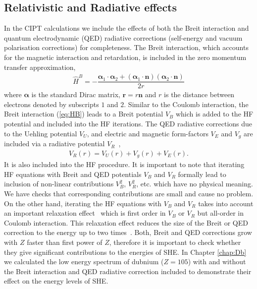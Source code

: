 \documentclass[10pt,a4paper, twoside, openright]{report}
\begin{document}
\subsection{Relativistic and Radiative effects}
In the CIPT calculations we include the effects of both the Breit interaction \cite{Breit1929, Mann1971} and quantum electrodynamic (QED) radiative corrections (self-energy and vacuum polarisation corrections) \cite{FG2005} for completeness. The Breit interaction, which accounts for the magnetic interaction and retardation, is included in the zero momentum transfer approximation,
\begin{align}\label{eq:HB}
\hat{H}^B = -\dfrac{\boldsymbol{\alpha}_1 \cdot \boldsymbol{\alpha}_2 + \left(\boldsymbol{\alpha}_1\cdot\textbf{n}\right)\left(\boldsymbol{\alpha}_2\cdot \textbf{n}\right)}{2r}
\end{align}
where $\boldsymbol{\alpha}$ is the standard Dirac matrix, $\textbf{r}=r\textbf{n}$ and $r$ is the distance between electrons denoted by subscripts $1$ and $2$.  Similar to the Coulomb interaction, the Breit interaction (\ref{eq:HB}) leads to a Breit potential $V_B$ which is added to the HF potential and included into the HF iterations. The QED radiative corrections due to the Uehling potential $V_U$, and electric and magnetic form-factors $V_E $ and $ V_g$  are included via a radiative potential $V_R$~\cite{FG2005},
\begin{align}\label{eq:VR}
V_{R}(r) = V_{U}(r) + V_{g}(r) + V_{E}(r).
\end{align}
It is also included into the HF procedure. It is important to note that iterating HF equations with Breit and QED potentials $V_B$ and $V_R$ formally lead to inclusion of non-linear contributions  $V_B^2$, $V_R^2$, etc. which have no physical meaning. We have checks that corresponding contributions are small and cause no problem. On the other hand, iterating the HF equations with $V_B$ and $V_R$ takes into account an important relaxation effect~\cite{DF2016} which is first order in $V_B$ or $V_R$ but all-order in Coulomb interaction. This relaxation effect reduces the size of the Breit or QED correction to the energy up to two times~\cite{DF2016}. Both, Breit and QED corrections grow with $Z$ faster than first power of $Z$, therefore it is important to check whether they give significant contributions to the energies of SHE.  In Chapter \ref{chap:Db} we calculated the low energy spectrum of dubnium ($Z=105$) with and without the Breit interaction and QED radiative correction included to demonstrate their effect on the energy levels of SHE.
\end{document}
